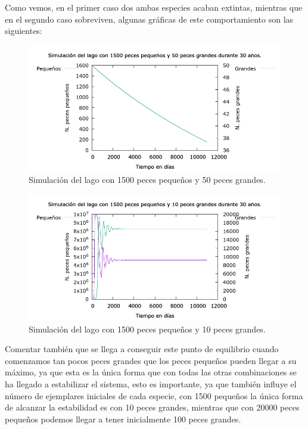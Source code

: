 \documentclass[12pt, spanish]{article}
\begin{document}
Como vemos, en el primer caso dos ambas especies acaban extintas, mientras que en el segundo caso sobreviven, algunas gráficas de este comportamiento son las siguientes:


\begin{figure}[H]
	\centering
	\includegraphics[scale = 0.6]{lago_10950_1500_50.png}
	\caption{Simulación del lago con 1500 peces pequeños y 50 peces grandes.}
	\label{fig:ej4}
\end{figure}

\begin{figure}[H]
	\centering
	\includegraphics[scale = 0.6]{lago_10950_1500_10.png}
	\caption{Simulación del lago con 1500 peces pequeños y 10 peces grandes.}
	\label{fig:ej4}
\end{figure}

Comentar también que se llega a conseguir este punto de equilibrio cuando comenzamos tan pocos peces grandes que los peces pequeños pueden llegar a su máximo, ya que esta es la única forma que con todas las otras combinaciones se ha llegado a estabilizar el sistema, esto es importante, ya que también influye el número de ejemplares iniciales de cada especie, con 1500 pequeños la única forma de alcanzar la estabilidad es con 10 peces grandes, mientras que con 20000 peces pequeños podemos llegar a tener inicialmente 100 peces grandes.
\end{document}
